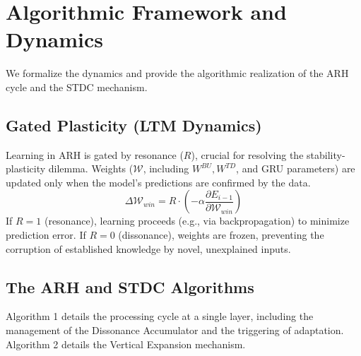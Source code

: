 \documentclass{article}
\begin{document}
\section{Algorithmic Framework and Dynamics}

We formalize the dynamics and provide the algorithmic realization of the ARH cycle and the STDC mechanism.

\subsection{Gated Plasticity (LTM Dynamics)}
Learning in ARH is gated by resonance ($R$), crucial for resolving the stability-plasticity dilemma. Weights ($\mathcal{W}$, including $W^{BU}, W^{TD}$, and GRU parameters) are updated only when the model's predictions are confirmed by the data.
\begin{equation}
\Delta \mathcal{W}_{win} = R \cdot \left( -\alpha \frac{\partial E_{i-1}}{\partial \mathcal{W}_{win}} \right)
\end{equation}
If $R=1$ (resonance), learning proceeds (e.g., via backpropagation) to minimize prediction error. If $R=0$ (dissonance), weights are frozen, preventing the corruption of established knowledge by novel, unexplained inputs.

\subsection{The ARH and STDC Algorithms}

Algorithm 1 details the processing cycle at a single layer, including the management of the Dissonance Accumulator and the triggering of adaptation. Algorithm 2 details the Vertical Expansion mechanism.
\end{document}
